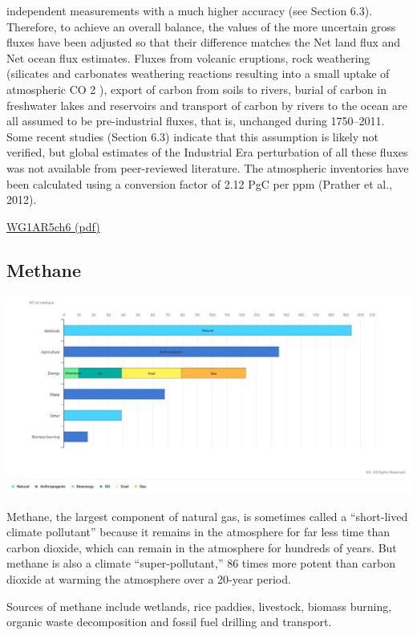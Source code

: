 \documentclass[
]{book}
\begin{document}
{independent measurements with a much higher accuracy (see Section 6.3). Therefore, to achieve an overall balance, the values of the more uncertain gross fluxes have been adjusted
so that their difference matches the Net land flux and Net ocean flux estimates. Fluxes from volcanic eruptions, rock weathering (silicates and carbonates weathering reactions
resulting into a small uptake of atmospheric CO 2 ), export of carbon from soils to rivers, burial of carbon in freshwater lakes and reservoirs and transport of carbon by rivers to the
ocean are all assumed to be pre-industrial fluxes, that is, unchanged during 1750--2011. Some recent studies (Section 6.3) indicate that this assumption is likely not verified, but
global estimates of the Industrial Era perturbation of all these fluxes was not available from peer-reviewed literature. The atmospheric inventories have been calculated using a
conversion factor of 2.12 PgC per ppm (Prather et al., 2012).}

\href{pdf/WG1AR5_Chapter06_FINAL.pdf}{WG1AR5ch6 (pdf)}

\hypertarget{methane}{%
\subsection{Methane}\label{methane}}

\includegraphics{fig/Methane_by_Source.jpeg}

Methane, the largest component of natural gas, is sometimes called a ``short-lived climate pollutant'' because it remains in the atmosphere for far less time than carbon dioxide, which can remain in the atmosphere for hundreds of years. But methane is also a climate ``super-pollutant,'' 86 times more potent than carbon dioxide at warming the atmosphere over a 20-year period.

Sources of methane include wetlands, rice paddies, livestock, biomass burning, organic waste decomposition and fossil fuel drilling and transport.
\end{document}
